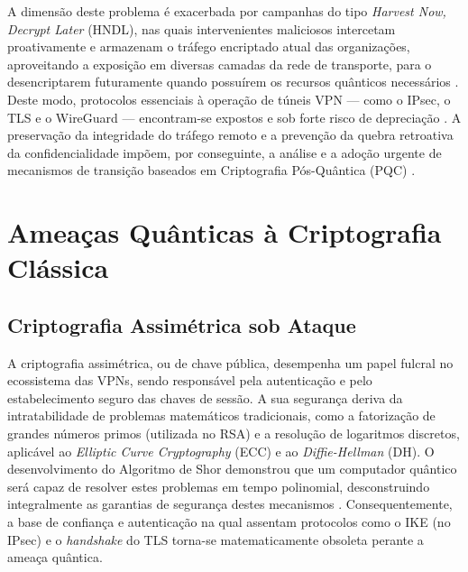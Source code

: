 \documentclass[runningheads]{llncs}
\begin{document}
A dimensão deste problema é exacerbada por campanhas do tipo \textit{Harvest Now, Decrypt Later} (HNDL), nas quais intervenientes maliciosos intercetam proativamente e armazenam o tráfego encriptado atual das organizações, aproveitando a exposição em diversas camadas da rede de transporte, para o desencriptarem futuramente quando possuírem os recursos quânticos necessários \cite{kundu2026postquantumcryptographicanalysismessage}. Deste modo, protocolos essenciais à operação de túneis VPN — como o IPsec, o TLS e o WireGuard — encontram-se expostos e sob forte risco de depreciação \cite{oterogarcia2025introducingpostquantumalgorithmsopen}. A preservação da integridade do tráfego remoto e a prevenção da quebra retroativa da confidencialidade impõem, por conseguinte, a análise e a adoção urgente de mecanismos de transição baseados em Criptografia Pós-Quântica (PQC) \cite{10827179}.

\section{Ameaças Quânticas à Criptografia Clássica}

\subsection{Criptografia Assimétrica sob Ataque}
A criptografia assimétrica, ou de chave pública, desempenha um papel fulcral no ecossistema das VPNs, sendo responsável pela autenticação e pelo estabelecimento seguro das chaves de sessão. A sua segurança deriva da intratabilidade de problemas matemáticos tradicionais, como a fatorização de grandes números primos (utilizada no RSA) e a resolução de logaritmos discretos, aplicável ao \textit{Elliptic Curve Cryptography} (ECC) e ao \textit{Diffie-Hellman} (DH). O desenvolvimento do Algoritmo de Shor demonstrou que um computador quântico será capaz de resolver estes problemas em tempo polinomial, desconstruindo integralmente as garantias de segurança destes mecanismos \cite{article}. Consequentemente, a base de confiança e autenticação na qual assentam protocolos como o IKE (no IPsec) e o \textit{handshake} do TLS torna-se matematicamente obsoleta perante a ameaça quântica.
\end{document}
